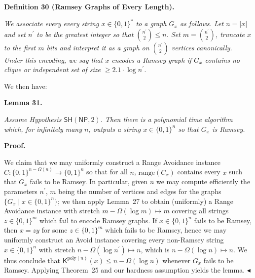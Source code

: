 \documentclass[10pt,a4paper]{article}
\begin{document}


\par\medskip\noindent\textbf{
\textbf{Definition 30}\textbf{ }(Ramsey Graphs of Every Length)\textbf{.}
}\par



\emph{We associate every every string $x\in\{0,1\}^{*}$ to a graph $G_{x}$ as follows. Let $n=|x|$ and set $n^{\prime}$ to be the greatest integer so that $\binom{n^{\prime}}{2}\leq n$. Set $m=\binom{n^{\prime}}{2}$, truncate $x$ to the first $m$ bits and interpret it as a graph on $\binom{n^{\prime}}{2}$ vertices canonically. Under this encoding, we say that $x$ encodes a Ramsey graph if $G_{x}$ contains no clique or independent set of size $\geq 2.1\cdot\log n^{\prime}$.}\par






We then have:\par





\par\medskip\noindent\textbf{
\textbf{Lemma 31}\textbf{.}
}\par



\emph{Assume Hypothesis $\mathsf{SH}({\mathsf{NP}},2)$. Then there is a polynomial time algorithm which, for infinitely many $n$, outputs a string $x\in\{0,1\}^{n}$ so that $G_{x}$ is Ramsey.}\par







\par\medskip\noindent\textbf{Proof.}\par




We claim that we may uniformly construct a Range Avoidance instance $C:\{0,1\}^{n-\Omega(n)}\to\{0,1\}^{n}$ so that for all $n$, $\mathrm{range}(C_{x})$ contains every $x$ such that $G_{x}$ fails to be Ramsey. In particular, given $n$ we may compute efficiently the parameters $n^{\prime}$, $m$ being the number of vertices and edges for the graphs $\{G_{x}\mid x\in\{0,1\}^{n}\}$; we then apply Lemma 27 to obtain (uniformly) a Range Avoidance instance with stretch $m-\Omega(\log m)\mapsto m$ covering all strings $z\in\{0,1\}^{m}$ which fail to encode Ramsey graphs. If $x\in\{0,1\}^{n}$ fails to be Ramsey, then $x=zy$ for some $z\in\{0,1\}^{m}$ which fails to be Ramsey, hence we may uniformly construct an Avoid instance covering every non-Ramsey string $x\in\{0,1\}^{n}$ with stretch $n-\Omega(\log n^{\prime})\mapsto n$, which is $n-\Omega(\log n)\mapsto n$.
We thus conclude that ${\mathsf{K}}^{\mathrm{poly}(n)}(x)\leq n-\Omega(\log n)$ whenever $G_{x}$ fails to be Ramsey. Applying Theorem 25 and our hardness assumption yields the lemma.
$\blacktriangleleft$\par
\end{document}
